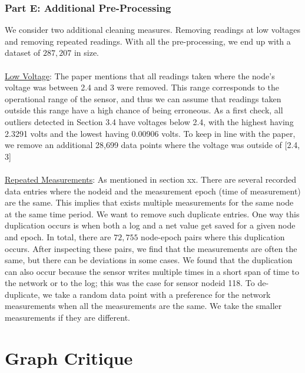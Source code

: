 \documentclass[11pt, letterpaper]{article}
\begin{document}
\subsubsection{Part E: Additional Pre-Processing}
We consider two additional cleaning measures. Removing readings at low voltages and removing repeated readings. With all the pre-processing, we end up with a dataset of $287,207$ in size.
\\ \\
\underline{Low Voltage}: The paper mentions that all readings taken where the node's voltage was between 2.4 and 3 were removed. This range corresponds to the operational range of the sensor, and thus we can assume that readings taken outside this range have a high chance of being erroneous. As a first check, all outliers detected in Section 3.4 have voltages below 2.4, with the highest having 2.3291 volts and the lowest having 0.00906 volts. To keep in line with the paper, we remove an additional 28,699 data points where the voltage was outside of [2.4, 3]
\\ \\
\underline{Repeated Measurements}: As mentioned in section xx. There are several recorded data entries where the nodeid and the measurement epoch (time of measurement) are the same. This implies that exists multiple measurements for the same node at the same time period. We want to remove such duplicate entries. One way this duplication occurs is when both a log and a net value get saved for a given node and epoch. In total, there are $72,755$ node-epoch pairs where this duplication occurs. After inspecting these pairs, we find that the measurements are often the same, but there can be deviations in some cases. We found that the duplication can also occur because the sensor writes multiple times in a short span of time to the network or to the log; this was the case for sensor nodeid 118. To de-duplicate, we take a random data point with a preference for the network measurements when all the measurements are the same. We take the smaller measurements if they are different. 


\section{Graph Critique}
\end{document}
